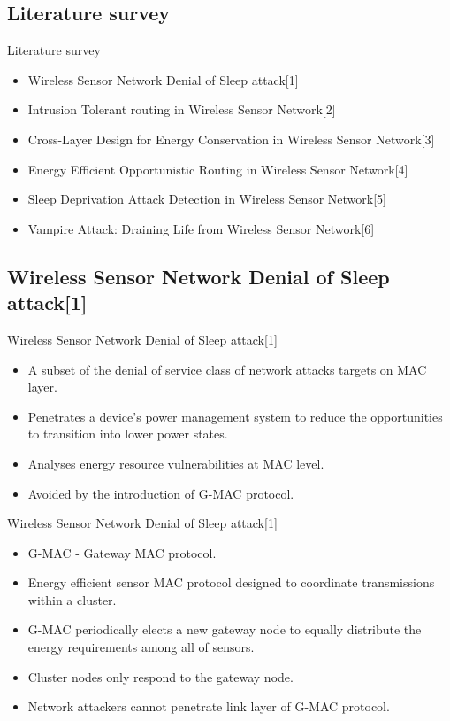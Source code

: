 \subsection{Literature survey}
\begin{frame}{Literature survey}
 \begin{itemize}
  \item Wireless Sensor Network Denial of Sleep attack[1]
  \item Intrusion Tolerant routing in Wireless Sensor Network[2]
  \item Cross-Layer Design for Energy Conservation in Wireless Sensor Network[3]
   \item Energy Efficient Opportunistic Routing in Wireless Sensor Network[4] 
   \item Sleep Deprivation Attack Detection in  Wireless Sensor Network[5]
   \item Vampire Attack: Draining Life from  Wireless Sensor Network[6]
   \end{itemize}
 \end{frame} 
 
 
\subsection{Wireless Sensor Network Denial of Sleep attack[1]}
\begin{frame}{Wireless Sensor Network Denial of Sleep attack[1]}
\begin{itemize}
\item A subset of the denial of service class of network attacks targets on MAC layer.
\item Penetrates a device's power management system to reduce the opportunities to transition into lower power states.
\item Analyses energy resource vulnerabilities at MAC level.
\item Avoided by the introduction of G-MAC protocol.
\end{itemize}
\end{frame}


\begin{frame}{Wireless Sensor Network Denial of Sleep attack[1]}
\begin{itemize}
\item G-MAC - Gateway MAC protocol.
\item Energy efficient sensor MAC protocol designed to coordinate transmissions within a cluster.
\item G-MAC periodically elects a new gateway node to equally distribute the energy requirements among all of sensors.
\item Cluster nodes only respond to the gateway node.
\item Network attackers cannot penetrate link layer of G-MAC protocol.
\end{itemize}
\end{frame}

